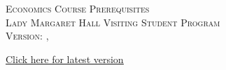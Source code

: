 \documentclass[addpoints,12pt,a4paper]{exam}
\begin{document}
\begin{center}

  \textsc{\Large Economics Course Prerequisites \\ \normalsize Lady Margaret Hall Visiting Student Program \\ \vspace{0.5em} Version: \DTMtoday, \DTMcurrenttime}

  \vspace{1em}

  \href{https://raw.githubusercontent.com/fditraglia/lmh-econ-diagnostic/main/lmh-econ-prereqs.pdf}{\underline{Click here for latest version}}

\vspace{5em}

\end{center}
\end{document}
